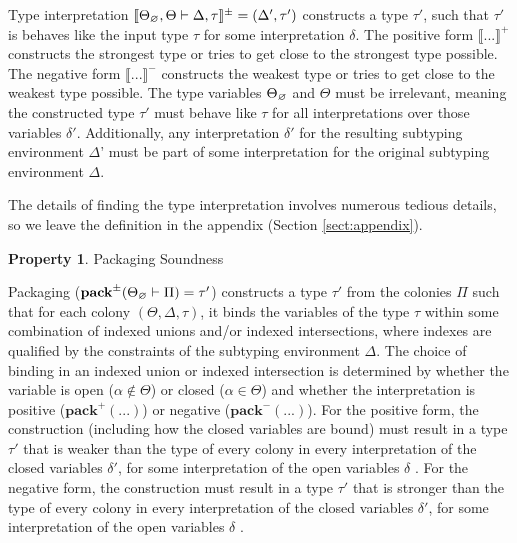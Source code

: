 \documentclass[acmsmall]{acmart}
\theoremstyle{definition}
\newtheorem{property}{Property}[section]
\begin{document}
\noindent
Type interpretation $\llbracket \Theta_\ignore, \Theta \entails \Delta, \tau \rrbracket^\pm = (\Delta', \tau')$
constructs a type $\tau'$, such that $\tau'$ is behaves like the input type $\tau$ for some interpretation $\delta$. 
The positive form $\llbracket ... \rrbracket^+$ constructs the strongest type or tries to get close to the strongest type possible.  
The negative form $\llbracket ... \rrbracket^-$ constructs the weakest type or tries to get close to the weakest type possible. 
The type variables $\Theta_\ignore$ and $\Theta$ must be irrelevant, meaning
the constructed type $\tau'$ must behave like $\tau$ 
for all interpretations over those variables $\delta'$.
Additionally, any interpretation $\delta'$ for the resulting subtyping environment $\Delta$' must
be part of some interpretation for the original subtyping environment $\Delta$.

The details of finding the type interpretation involves numerous tedious details, so we leave the definition
in the appendix (Section \ref{sect:appendix}).

\begin{property}
  \label{prop:packaging_soundness}
  Packaging Soundness 
  \\
  \begin{mathpar}
  \end{mathpar}
\end{property}

\noindent
Packaging ($\textbf{pack}^\pm(\Theta_\ignore \entails \Pi) = \tau'$)
constructs a type $\tau'$ from the colonies $\Pi$
such that for each colony $(\Theta, \Delta, \tau)$,
it binds the variables of the type $\tau$ within
some combination of 
indexed unions and/or indexed intersections,
where indexes are qualified by the constraints 
of the subtyping environment $\Delta$.
The choice of binding in an indexed union or indexed intersection is 
determined by whether the variable is open ($\alpha \not\in \Theta$)
or closed ($\alpha \in \Theta$)
and whether the interpretation is 
positive ($\textbf{pack}^+(...)$) or negative ($\textbf{pack}^-(...)$).
For the positive form, the construction (including how the closed variables are bound)
must result in a type $\tau'$ that is weaker than the type of every colony in every interpretation
of the closed variables $\delta'$, for some interpretation of the open variables $\delta$  
.
For the negative form, the construction must result in a type $\tau'$
that is stronger than the type of every colony in every interpretation
of the closed variables $\delta'$, for some interpretation of the open variables $\delta$  
.
\end{document}
